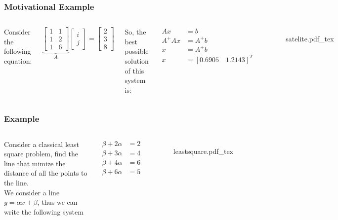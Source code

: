 \documentclass[aspectratio=169]{beamer}
\newcommand{\incfig}[2][1]{%
    \def\svgwidth{#1\columnwidth}
    {#2.pdf_tex} }
\begin{document}
\begin{frame} %
	\frametitle{Motivational Example}  %
	\begin{columns}


	Consider the following equation:

	\begin{equation*}
		\underbrace{\begin{bmatrix} 1 & 1 \\ 1 & 2 \\ 1 & 6 \end{bmatrix}}_A \begin{bmatrix} i \\ j  \end{bmatrix} = \begin{bmatrix} 2 \\ 3 \\ 8 \end{bmatrix}
	\end{equation*}

So, the best possible solution of this system is:

\begin{align*}
	A x &= b \\
	A^+ A x &= A^+ b \\
	x &= A^+ b\\
	x & = [0.6905 \quad 1.2143]^T
\end{align*}
	\begin{figure}[ht]
    		\centering
	    \incfig{satelite}
	\end{figure}
	\end{columns}

\end{frame}

\begin{frame}
	\frametitle{Example}
\begin{columns}


	Consider a classical least square problem, find the line that mimize the distance of all the points to the line.\\


	We consider a line $ y = \alpha x + \beta$, thus we can write the following system

	\begin{align*}
		\beta + 2 \alpha &= 2 \\	
		\beta + 3 \alpha &= 4 \\	
		\beta + 4 \alpha &= 6 \\	
		\beta + 6 \alpha &= 5	
	\end{align*}


\begin{figure}[ht]
    \centering
    \incfig{leastsquare}
    \label{fig:leastsquare}
\end{figure}

\end{columns}

\end{frame}
\end{document}

